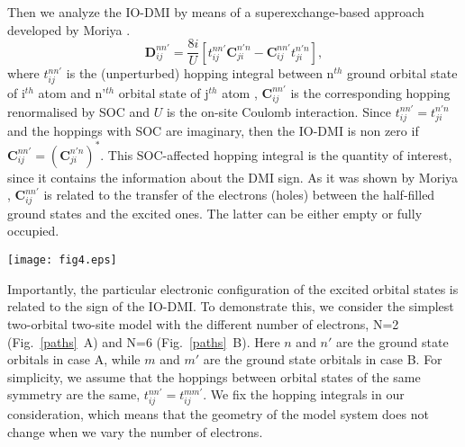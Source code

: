 \documentclass[aps,prl,showpacs,reprint,floatfix]{revtex4-1}
\begin{document}
Then we analyze the IO-DMI by means of a superexchange-based approach developed by Moriya \cite{Moriya2}. 
\begin{equation}
  \mathbf{D}^{nn'}_{ij} = \frac{8i}{U} [t^{nn'}_{ij} \mathbf{C}^{n'n}_{ji} - \mathbf{C}^{nn'}_{ij}t^{n'n}_{ji}],
\end{equation}
where $t^{nn'}_{ij}$ is the (unperturbed) hopping integral between n$^{th}$ ground orbital state of i$^{th}$ atom and n'$^{th}$ orbital state of j$^{th}$ atom , $\mathbf{C}^{nn'}_{ij}$ is the corresponding hopping renormalised by SOC and $U$ is the on-site Coulomb interaction. 
Since $t^{nn'}_{ij}=t^{n'n}_{ji}$ and the hoppings with SOC are imaginary, then the IO-DMI is non zero if $\mathbf{C}^{nn'}_{ij} = (\mathbf{C}^{n'n}_{ji})^{*}$.
This SOC-affected hopping integral is the quantity of interest, since it contains the information about the DMI sign.
As it was shown by Moriya \cite{Moriya2}, $\mathbf{C}^{nn'}_{ij}$ is related to the transfer of the electrons (holes) between the half-filled ground states and the excited ones. The latter can be either empty or fully occupied. 

\begin{figure*}
\centering
\texttt{[image: fig4.eps]}
\caption {Visualization of the toy tight-binding model proposed for explaining the change of DMI sign in the weak ferromagnets of this work. The filling of the energy levels in the ground state electronic configuration for N=2 ($\mathbf A$, left) and N=6 ($\mathbf B$ center) is shown. Arrows denote hopping (inter-atomic) and spin-orbit coupling (intra-atomic) excitations (between orbital states $n, n', m, m'$) corresponding to the Dzyaloshinskii-Moriya interaction. ($\mathbf C$, right) Comparison of the $\mathbf A$ and $\mathbf B$ excitation processes reveals the difference in hoppings between excited and ground states.}
\label{paths}
\end{figure*}

Importantly, the particular electronic configuration of the excited orbital states is related to the sign of the IO-DMI. 
To demonstrate this, we consider the simplest two-orbital two-site model with the different number of electrons, N=2 (Fig.~\ref{paths}~A)  and N=6 (Fig.~\ref{paths}~B). 
Here $n$ and $n'$ are the ground state orbitals in case A, while $m$ and $m'$ are the ground state orbitals in case B.
For simplicity, we assume that the hoppings between orbital states of the same symmetry are the same, $t_{ij}^{nn'} = t_{ij}^{mm'}$.  We fix the hopping integrals in our consideration, which means that the geometry of the model system does not change when we vary the number of electrons.
\end{document}
